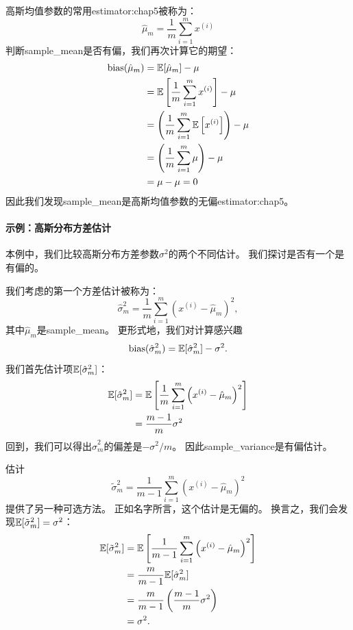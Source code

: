 高斯均值参数的常用\gls{estimator:chap5}被称为：
\begin{equation}
    \hat{\mu}_m = \frac{1}{m} \sum_{i=1}^m x^{(i)}
\end{equation}
判断\gls{sample_mean}是否有偏，我们再次计算它的期望：
\begin{align}
\text{bias} (\hat{\mu}_m) &= \mathbb{E}[ \hat{\mu}_m ]  - \mu \\
    &= \mathbb{E} \left[ \frac{1}{m} \sum_{i=1}^m x^{(i)}  \right] - \mu \\
    &= \left( \frac{1}{m}\sum_{i=1}^m \mathbb{E} \left[ x^{(i)} \right] \right) - \mu \\
    &= \left( \frac{1}{m}\sum_{i=1}^m \mu \right) - \mu \\
    &= \mu - \mu = 0
\end{align}
因此我们发现\gls{sample_mean}是高斯均值参数的无偏\gls{estimator:chap5}。


\paragraph{示例：高斯分布方差估计}
本例中，我们比较高斯分布方差参数$\sigma^2$的两个不同估计。
我们探讨是否有一个是有偏的。

我们考虑的第一个方差估计被称为：
\begin{equation}
    \hat{\sigma}_m^2 = \frac{1}{m} \sum_{i=1}^m \left( x^{(i)} - \hat{\mu}_m \right)^2,
\end{equation}
其中$\hat{\mu}_m$是\gls{sample_mean}。
更形式地，我们对计算感兴趣
\begin{equation}
\label{eq:5.37}
    \text{bias} (\hat{\sigma}_m^2) = \mathbb{E} [ \hat{\sigma}_m^2 ]  - \sigma^2.
\end{equation}
我们首先估计项$\mathbb{E} [ \hat{\sigma}_m^2 ]$：
\begin{align}
    \mathbb{E} [ \hat{\sigma}_m^2 ]  &= \mathbb{E} \left[ \frac{1}{m} \sum_{i=1}^m \left( x^{(i)} - \hat{\mu}_m \right)^2  \right] \\
    &= \frac{m-1}{m} \sigma^2
\end{align}
回到，我们可以得出$\hat{\sigma}^2_m$的偏差是$-\sigma^2/m$。
因此\gls{sample_variance}是有偏估计。

估计
\begin{equation}
    \tilde{\sigma}_m^2 = \frac{1}{m-1} \sum_{i=1}^m \left( x^{(i)} - \hat{\mu}_m \right)^2
\end{equation}
提供了另一种可选方法。
正如名字所言，这个估计是无偏的。
换言之，我们会发现$\mathbb{E}[\tilde{\sigma}_m^2] = \sigma^2$：
\begin{align}
    \mathbb{E}[\tilde{\sigma}_m^2] &= \mathbb{E} \left[ \frac{1}{m-1} \sum_{i=1}^m \left( x^{(i)} - \hat{\mu}_m \right)^2 \right] \\
        &= \frac{m}{m-1} \mathbb{E}[ \hat{\sigma}_m^2 ]  \\
        &= \frac{m}{m-1} \left( \frac{m-1}{m} \sigma^2 \right) \\
        &= \sigma^2.
\end{align}

